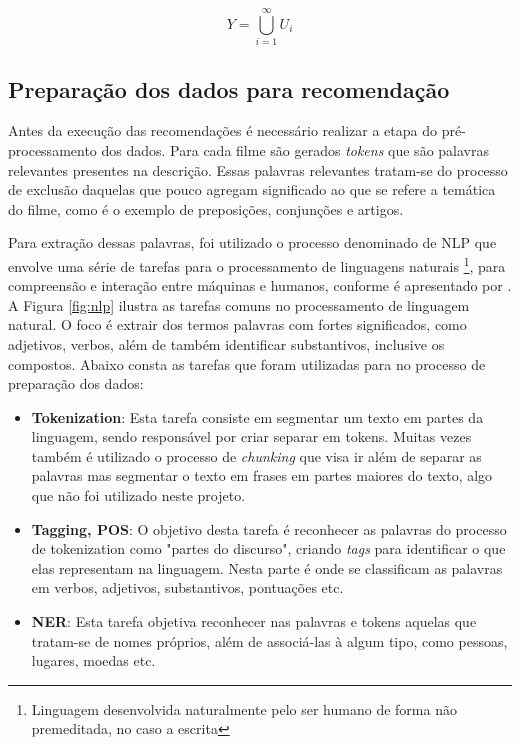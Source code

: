 \begin{equation}
	Y = \bigcup\limits_{i=1}^{\infty} U_i
\label{eq:user_model5}
\end{equation}

\subsection{Preparação dos dados para recomendação}
\label{ssec:data_nlp}

Antes da execução das recomendações é necessário realizar a etapa do pré-processamento dos dados. Para cada filme são gerados \textit{tokens} que são palavras relevantes presentes na descrição. Essas palavras relevantes tratam-se do processo de exclusão daquelas que pouco agregam significado ao que se refere a temática do filme, como é o exemplo de preposições, conjunções e artigos.

Para extração dessas palavras, foi utilizado o processo denominado de \ac{NLP} que envolve uma série de tarefas para o processamento de linguagens naturais \footnote{Linguagem desenvolvida naturalmente pelo ser humano de forma não premeditada, no caso a escrita}, para compreensão e interação entre máquinas e humanos, conforme é apresentado por \cite{Collobert:2011}. A Figura \ref{fig:nlp} ilustra as tarefas comuns no processamento de linguagem natural. O foco é extrair dos termos palavras com fortes significados, como adjetivos, verbos, além de também identificar substantivos, inclusive os compostos. Abaixo consta as tarefas que foram utilizadas para no processo de preparação dos dados:

\begin{itemize}
	\item{\textbf{Tokenization}: Esta tarefa consiste em segmentar um texto em partes da linguagem, sendo responsável por criar separar em tokens. Muitas vezes também é utilizado o processo de \textit{chunking} que visa ir além de separar as palavras mas segmentar o texto em frases em partes maiores do texto, algo que não foi utilizado neste projeto.}
	\item{\textbf{Tagging, \ac{POS}}: O objetivo desta tarefa é reconhecer as palavras do processo de tokenization como "partes do discurso", criando \textit{tags} para identificar o que elas representam na linguagem. Nesta parte é onde se classificam as palavras em verbos, adjetivos, substantivos, pontuações etc.}
	\item{\textbf{\ac{NER}}: Esta tarefa objetiva reconhecer nas palavras e tokens aquelas que tratam-se de nomes próprios, além de associá-las à algum tipo, como pessoas, lugares, moedas etc.}
\end{itemize}

